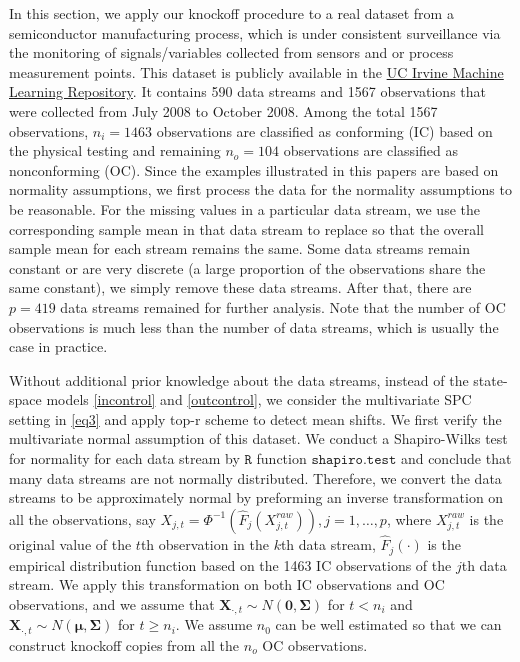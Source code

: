 \documentclass[]{interact}
\theoremstyle{plain}%
\theoremstyle{definition}
\theoremstyle{remark}
\begin{document}
In this section, we apply our knockoff procedure to a real dataset from a semiconductor manufacturing process, which is under consistent surveillance via the monitoring of signals/variables collected from sensors and or process measurement points. This dataset is publicly available in the \href{http://archive.ics.uci.edu/ml/datasets/SECOM}{UC Irvine Machine Learning Repository}. It contains 590 data streams and 1567 observations that were collected from July 2008 to October 2008. Among the total 1567 observations, $n_i=1463$ observations are classified as conforming (IC) based on the physical testing and remaining $n_o=104$ observations are classified as nonconforming (OC). Since the examples illustrated in this papers are based on normality assumptions, we first process the data for the normality assumptions to be reasonable. For the missing values in a particular data stream, we use the corresponding sample mean in that data stream to replace so that the overall sample mean for each stream remains the same. Some data streams remain constant or are very discrete (a large proportion of the observations share the same constant), we simply remove these data streams. After that, there are $p=419$ data streams remained for further analysis. Note that the number of OC observations is much less than the number of data streams, which is usually the case in practice.

Without additional prior knowledge about the data streams, instead of the state-space models \eqref{incontrol} and \eqref{outcontrol}, we consider the multivariate SPC setting in \eqref{eq3} and apply top-r scheme to detect mean shifts. We first verify the multivariate normal assumption of this dataset. We conduct a Shapiro-Wilks test for normality for each data stream by $\mathtt{R}$ function $\mathtt{shapiro.test}$ and conclude that many data streams are not normally distributed. Therefore, we convert the data streams to be approximately normal by preforming an inverse transformation on all the observations, say $X_{j,t}=\Phi^{-1}\left( \hat F_{j}(X_{j,t}^{raw})\right), j=1, \ldots, p$, where $X_{j,t}^{raw}$ is the original value of the $t$th observation in the $k$th data stream, $\hat F_{j}(\cdot)$ is the empirical distribution function based on the 1463 IC observations of the $j$th data stream. We apply this transformation on both IC observations and OC observations, and we assume that $\bm{X}_{\cdot,t}\sim N(\bm{0},\bm\Sigma)$ for $t<n_i$ and $\bm{X}_{\cdot,t}\sim N(\bm\mu,\bm\Sigma)$ for $t\geq n_i$. We assume $n_0$ can be well estimated so that we can construct knockoff copies from all the $n_o$ OC observations. 
\end{document}
